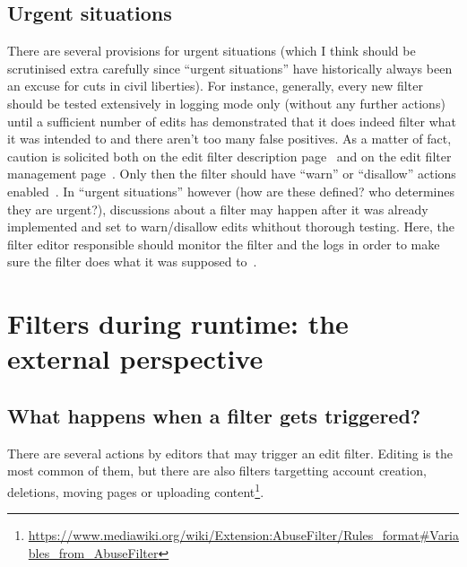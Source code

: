 \subsection{Urgent situations}

There are several provisions for urgent situations (which I think should be scrutinised extra carefully since ``urgent situations'' have historically always been an excuse for cuts in civil liberties).
For instance, generally, every new filter should be tested extensively in logging mode only (without any further actions) until a sufficient number of edits has demonstrated that it does indeed filter what it was intended to and there aren't too many false positives.
As a matter of fact, caution is solicited both on the edit filter description page~\cite{Wikipedia:EditFilter} and on the edit filter management page~\cite{Wikipedia:EditFilterManagement}.
Only then the filter should have ``warn'' or ``disallow'' actions enabled~\cite{Wikipedia:EditFilter}.
In ``urgent situations'' however (how are these defined? who determines they are urgent?), discussions about a filter may happen after it was already implemented and set to warn/disallow edits whithout thorough testing.
Here, the filter editor responsible should monitor the filter and the logs in order to make sure the filter does what it was supposed to~\cite{Wikipedia:EditFilter}.

\section{Filters during runtime: the external perspective}
\subsection{What happens when a filter gets triggered?}

There are several actions by editors that may trigger an edit filter.
Editing is the most common of them, but there are also filters targetting account creation, deletions, moving pages or uploading content\footnote{\url{https://www.mediawiki.org/wiki/Extension:AbuseFilter/Rules_format\#Variables_from_AbuseFilter}}.


